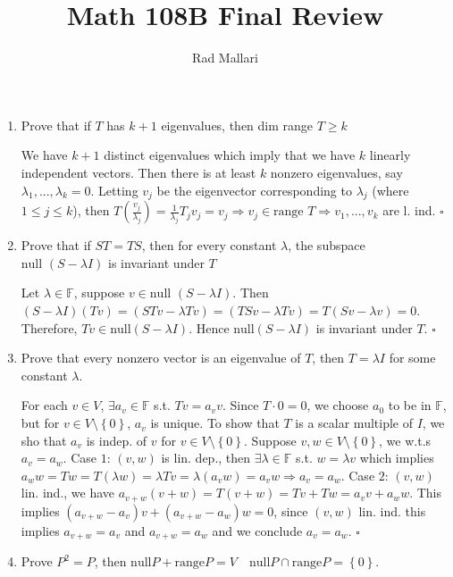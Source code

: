 \documentclass[12pt]{article}
\title{Math 108B Final Review}
\author{Rad Mallari}
\newcommand{\set}[1]{\left\{ #1\right\}}
\newenvironment{proof}{\noindent{\bf Proof.}}{\hfill $\square$\medskip}
\begin{document}
\maketitle
\begin{enumerate}
    \item Prove that if $T$ has $k+1$ eigenvalues, then dim range $T\geq k$

    \begin{proof}
        We have $k+1$ distinct eigenvalues which imply that we have $k$ linearly independent vectors. Then there is at least $k$ nonzero eigenvalues, say $\lambda_{1},...,\lambda_{k}=0$. Letting $v_{j}$ be the eigenvector corresponding to $\lambda_{j}$ (where $1\leq j\leq k$), then $T(\frac{v_{j}}{\lambda_{j}})=\frac{1}{\lambda_{j}}T_{j}v_{j}=v_{j}\Rightarrow v_{j}\in\text{range }T\Rightarrow v_{1},...,v_{k}$ are l. ind.
    \end{proof}
    \item Prove that if $ST=TS$, then for every constant $\lambda$, the subspace $\text{null }(S-\lambda I)$ is invariant under $T$

    \begin{proof}
        Let $\lambda\in \mathbb{F}$, suppose $v\in\text{null }(S-\lambda I)$. Then $(S-\lambda I)(Tv)=(STv-\lambda Tv)=(TSv-\lambda Tv)=T(Sv-\lambda v)=0$. Therefore, $Tv\in\text{null}(S-\lambda I)$. Hence $\text{null}(S-\lambda I)$ is invariant under $T$.
    \end{proof}
    \item Prove that every nonzero vector is an eigenvalue of $T$, then $T=\lambda I$ for some constant $\lambda$.
    
    \begin{proof}
        For each $v\in V$, $\exists a_{v}\in\mathbb{F}$ s.t. $Tv=a_{v}v$. Since $T\cdot0=0$, we choose $a_{0}$ to be in $\mathbb{F}$, but for $v\in V\setminus\set{0}$, $a_{v}$ is unique. To show that $T$ is a scalar multiple of $I$, we sho that $a_{v}$ is indep. of $v$ for $v\in V\setminus\set{0}$. Suppose $v,w\in V\setminus\set{0}$, we w.t.s $a_{v}=a_{w}$. Case $1$: $(v,w)$ is lin. dep., then $\exists\lambda\in\mathbb{F}$ s.t. $w=\lambda v$ which implies $a_{w}w=Tw=T(\lambda w)=\lambda Tv=\lambda (a_{v}w)=a_{v}w\Rightarrow a_{v}=a_{w}$. Case $2$: $(v,w)$ lin. ind., we have $a_{v+w}(v+w)=T(v+w)=Tv+Tw=a_{v}v+a_{w}w$. This implies $(a_{v+w}-a_{v})v+(a_{v+w}-a_{w})w=0$, since $(v,w)$ lin. ind. this implies $a_{v+w}=a_{v}$ and $a_{v+w}=a_{w}$ and we conclude $a_{v}=a_{w}$. 
    \end{proof}
    \item Prove $P^{2}=P$, then $\text{null}P+\text{range}P=V\quad\text{null}P\cap\text{range}P=\set{0}$.
    

\end{enumerate}
\end{document}
